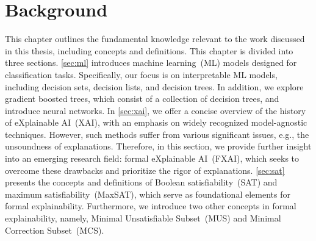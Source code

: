\chapter{Background}\label{chap:bg}

This chapter outlines the fundamental knowledge relevant to the work discussed in this thesis,
including concepts and definitions.
%
This chapter is divided into three sections.
%
\autoref{sec:ml} introduces machine learning~(ML) models designed for classification tasks. 
%
Specifically, our focus is on interpretable ML models, including decision sets, decision lists, and decision trees. 
%
In addition, we explore gradient boosted trees, which consist of a collection of decision trees,
and introduce neural networks.
%
In \autoref{sec:xai}, we offer a concise overview of the history of eXplainable AI~(XAI), 
with an emphasis on widely recognized model-agnostic techniques.
%
However, such methods suffer from various significant issues,
e.g., the unsoundness of explanations.
%
Therefore, in this section, we provide further insight into an emerging research field: formal
eXplainable AI~(FXAI), which seeks to overcome these drawbacks and prioritize the rigor of explanations.
%
\autoref{sec:sat} presents the concepts and definitions of Boolean satisfiability~(SAT) and maximum satisfiability~(MaxSAT), which serve as foundational elements for formal explainability. 
%
Furthermore, we introduce two other  concepts in formal explainability, namely, Minimal Unsatisfiable Subset~(MUS) and Minimal Correction Subset~(MCS).




